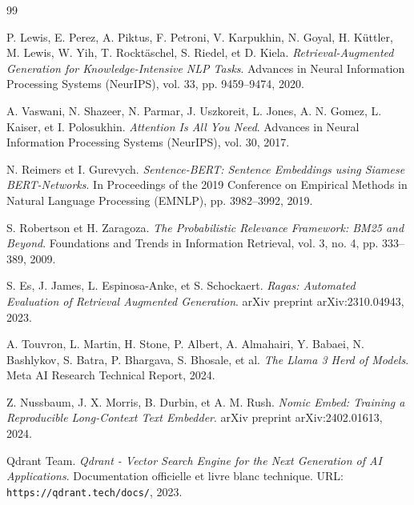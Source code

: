 \renewcommand{\bibname}{Bibliographie et Webographie}
\renewcommand{\labelitemi}{$\bullet$}

\begin{thebibliography}{99}

P. Lewis, E. Perez, A. Piktus, F. Petroni, V. Karpukhin, N. Goyal, H. Küttler, M. Lewis, W. Yih, T. Rocktäschel, S. Riedel, et D. Kiela.
\newblock \textit{Retrieval-Augmented Generation for Knowledge-Intensive NLP Tasks}.
\newblock Advances in Neural Information Processing Systems (NeurIPS), vol. 33, pp. 9459--9474, 2020.

A. Vaswani, N. Shazeer, N. Parmar, J. Uszkoreit, L. Jones, A. N. Gomez, L. Kaiser, et I. Polosukhin.
\newblock \textit{Attention Is All You Need}.
\newblock Advances in Neural Information Processing Systems (NeurIPS), vol. 30, 2017.

N. Reimers et I. Gurevych.
\newblock \textit{Sentence-BERT: Sentence Embeddings using Siamese BERT-Networks}.
\newblock In Proceedings of the 2019 Conference on Empirical Methods in Natural Language Processing (EMNLP), pp. 3982--3992, 2019.

S. Robertson et H. Zaragoza.
\newblock \textit{The Probabilistic Relevance Framework: BM25 and Beyond}.
\newblock Foundations and Trends in Information Retrieval, vol. 3, no. 4, pp. 333--389, 2009.

S. Es, J. James, L. Espinosa-Anke, et S. Schockaert.
\newblock \textit{Ragas: Automated Evaluation of Retrieval Augmented Generation}.
\newblock arXiv preprint arXiv:2310.04943, 2023.

A. Touvron, L. Martin, H. Stone, P. Albert, A. Almahairi, Y. Babaei, N. Bashlykov, S. Batra, P. Bhargava, S. Bhosale, et al.
\newblock \textit{The Llama 3 Herd of Models}.
\newblock Meta AI Research Technical Report, 2024.

Z. Nussbaum, J. X. Morris, B. Durbin, et A. M. Rush.
\newblock \textit{Nomic Embed: Training a Reproducible Long-Context Text Embedder}.
\newblock arXiv preprint arXiv:2402.01613, 2024.

Qdrant Team.
\newblock \textit{Qdrant - Vector Search Engine for the Next Generation of AI Applications}.
\newblock Documentation officielle et livre blanc technique. URL: \texttt{https://qdrant.tech/docs/}, 2023.


\end{thebibliography}
